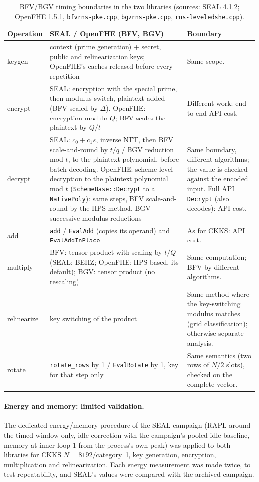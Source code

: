\documentclass[11pt]{article}
\begin{document}
\begin{table}[h!]\centering\footnotesize
\begin{tabular}{@{}L{2.0cm}L{6.9cm}L{7.1cm}@{}}
\toprule
\textbf{Operation} & \textbf{SEAL / OpenFHE (BFV, BGV)} & \textbf{Boundary} \\
\midrule
keygen & context (prime generation) + secret, public and relinearization keys; OpenFHE's caches released before every repetition & Same scope. \\
encrypt & SEAL: encryption with the special prime, then modulus switch, plaintext added (BFV scaled by $\Delta$). OpenFHE: encryption modulo $Q$; BFV scales the plaintext by $Q/t$ & Different work: end-to-end API cost. \\
decrypt & SEAL: $c_0 + c_1 s$, inverse NTT, then BFV scale-and-round by $t/q$ / BGV reduction mod $t$, to the plaintext polynomial, before batch decoding. OpenFHE: scheme-level decryption to the plaintext polynomial mod $t$ (\texttt{SchemeBase::Decrypt} to a \texttt{NativePoly}): same steps, BFV scale-and-round by the HPS method, BGV successive modulus reductions & Same boundary, different algorithms; the value is checked against the encoded input. Full API \texttt{Decrypt} (also decodes): API cost. \\
add & \texttt{add} / \texttt{EvalAdd} (copies its operand) and \texttt{EvalAddInPlace} & As for CKKS: API cost. \\
multiply & BFV: tensor product with scaling by $t/Q$ (SEAL: BEHZ; OpenFHE: HPS-based, its default); BGV: tensor product (no rescaling) & Same computation; BFV by different algorithms. \\
relinearize & key switching of the product & Same method where the key-switching modulus matches (grid classification); otherwise separate analysis. \\
rotate & \texttt{rotate\_rows} by 1 / \texttt{EvalRotate} by 1, key for that step only & Same semantics (two rows of $N/2$ slots), checked on the complete vector. \\
\bottomrule
\end{tabular}
\caption{BFV/BGV timing boundaries in the two libraries (sources: SEAL 4.1.2; OpenFHE 1.5.1, \texttt{bfvrns-pke.cpp}, \texttt{bgvrns-pke.cpp}, \texttt{rns-leveledshe.cpp}).}
\label{tab:bfvbgv}
\end{table}

\paragraph{Energy and memory: limited validation.} The dedicated energy/memory procedure of the SEAL campaign (RAPL around the timed window only, idle correction with the campaign's pooled idle baseline, memory at inner loop 1 from the process's own peak) was applied to both libraries for CKKS $N{=}8192$/category~1, key generation, encryption, multiplication and relinearization. Each energy measurement was made twice, to test repeatability, and SEAL's values were compared with the archived campaign.
\end{document}
